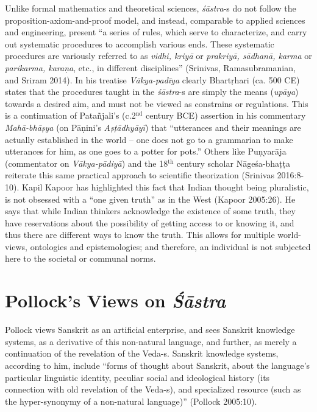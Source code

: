 Unlike formal mathematics and theoretical sciences, {\sl śāstra}-s do not follow the proposition-axiom-and-proof model, and instead, comparable to applied sciences and engineering, present ``a series of rules, which serve to characterize, and carry out systematic procedures to accomplish various ends. These systematic procedures are variously referred to as {\sl vidhi, kriyā} or {\sl prakriyā, sādhanā, karma} or {\sl parikarma, karaṇa}, etc., in different disciplines'' (Srinivas, Ramasubramanian, and Sriram 2014). In his treatise {\sl Vākya-padīya} clearly Bhartṛhari (ca. 500 CE) states that the procedures taught in the {\sl śāstra}-s are simply the means ({\sl upāya}) towards a desired aim, and must not be viewed as constrains or regulations. This is a continuation of Patañjali's (c.2$^{\text{nd}}$ century BCE) assertion in his commentary {\sl Mahā-bhāṣya} (on Pāṇini’s {\sl Aṣṭādhyāyī}) that ``utterances and their meanings are actually established in the world -- one does not go to a grammarian to make utterances for him, as one goes to a potter for pots.'' Others like Puṇyarāja (commentator on {\sl Vākya-pādiyā}) and the 18$^{\text{th}}$ century scholar Nāgeśa-bhaṭṭa reiterate this same practical approach to scientific theorization (Srinivas 2016:8-10). Kapil Kapoor has highlighted this fact that Indian thought being pluralistic, is not obsessed with a ``one given truth'' as in the West (Kapoor 2005:26). He says that while Indian thinkers acknowledge the existence of some truth, they have reservations about the possibility of getting access to or knowing it, and thus there are different ways to know the truth. This allows for multiple world-views, ontologies and epistemologies; and therefore, an individual is not subjected here to the societal or communal norms.  

\section*{Pollock’s Views on {\sl\bfseries Śāstra}}

Pollock views Sanskrit as an artificial enterprise, and sees Sanskrit knowledge systems, as a derivative of this non-natural language, and further, as merely a continuation of the revelation of the Veda-s. Sanskrit knowledge systems, according to him, include ``forms of thought about Sanskrit, about the language's particular linguistic identity, peculiar social and ideological history (its connection with old revelation of the Veda-s), and specialized resource (such as the hyper-synonymy of a non-natural language)'' (Pollock 2005:10). 

